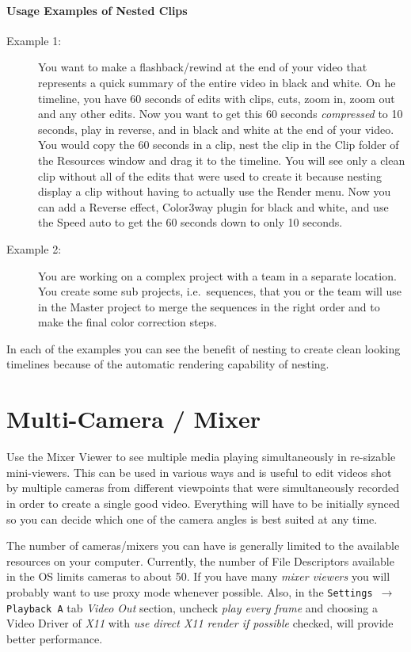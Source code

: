 \paragraph{Usage Examples of Nested Clips}

\begin{description}
	\item[Example 1:] You want to make a flashback/rewind at the end
	of your video that represents a quick summary of the entire video in
	black and white. On he timeline, you have 60 seconds of edits with
	clips, cuts, zoom in, zoom out and any other edits. Now you want to
	get this 60 seconds \textit{compressed} to 10 seconds, play in
	reverse, and in black and white at the end of your video.  You would
	copy the 60 seconds in a clip, nest the clip in the Clip folder of
	the Resources window and drag it to the timeline. You will see only
	a clean clip without all of the edits that were used to create it
	because nesting display a clip without having to actually use the
	Render menu.  Now you can add a Reverse effect, Color3way plugin for
	black and white, and use the Speed auto to get the 60 seconds down
	to only 10 seconds.
	\item[Example 2:] You are working on a complex project with a
	team in a separate location. You create some sub projects, i.e.\
	sequences, that you or the team will use in the Master project to
	merge the sequences in the right order and to make the final color
	correction steps.
\end{description}

In each of the examples you can see the benefit of nesting to create
clean looking timelines because of the automatic rendering
capability of nesting.

\section{Multi-Camera / Mixer}%
\label{sec:multicamera_mixer}

Use the Mixer Viewer to see multiple media playing simultaneously in re-sizable mini-viewers.  This can be used in various ways and is useful to edit videos shot by multiple cameras from different viewpoints that were simultaneously recorded in order to create a single good video.  Everything will have to be initially synced so you can decide which one of the camera angles is best suited at any time. 

The number of cameras/mixers you can have is generally limited to the available resources on your computer.  Currently, the number of File Descriptors available in the OS limits cameras to about 50.  If you have many \textit{mixer viewers} you will probably want to use proxy mode whenever possible.  Also, in the \texttt{Settings $\rightarrow$ Playback A} tab \textit{Video Out} section, uncheck \textit{play every frame} and choosing a Video Driver of \textit{X11} with \textit{use direct X11 render if possible} checked, will provide better performance.


